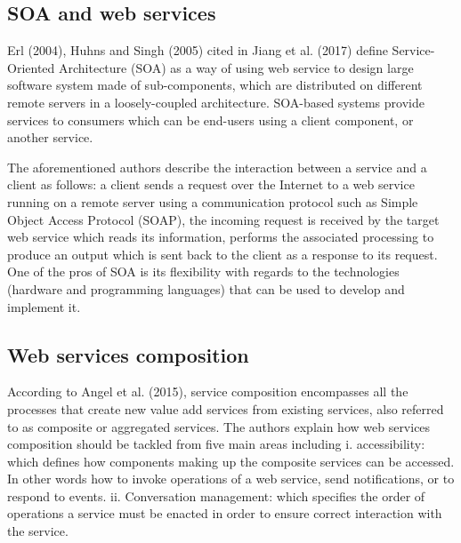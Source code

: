 \documentclass{article}
\begin{document}
\begin{multicols}{2}
\subsection{SOA and web services}

Erl (2004), Huhns and Singh (2005) cited in Jiang et al. (2017) define Service-Oriented Architecture (SOA) as a way of using web service to design large software system made of sub-components, which are distributed on different remote servers in a loosely-coupled architecture. SOA-based systems provide services to consumers which can be end-users using a client component, or another service. 

The aforementioned authors describe the interaction between a service and a client as follows: a client sends a request over the Internet to a web service running on a remote server using a communication protocol such as Simple Object Access Protocol (SOAP), the incoming request is received by the target web service which reads its information, performs the associated processing to produce an output which is sent back to the client as a response to its request. One of the pros of SOA is its flexibility with regards to the technologies (hardware and programming languages) that can be used to develop and implement it.
 
\subsection{Web services composition}
According to Angel et al. (2015), service composition encompasses all the processes that create new value add services from existing services, also referred to as composite or aggregated services. The authors explain how web services composition should be tackled from five main areas including i. accessibility: which defines how components making up the composite services can be accessed. In other words how to invoke operations of a web service, send notifications, or to respond to events. ii. Conversation management: which specifies the order of operations a service must be enacted in order to ensure correct interaction with the service. 


\end{multicols}
\end{document}
